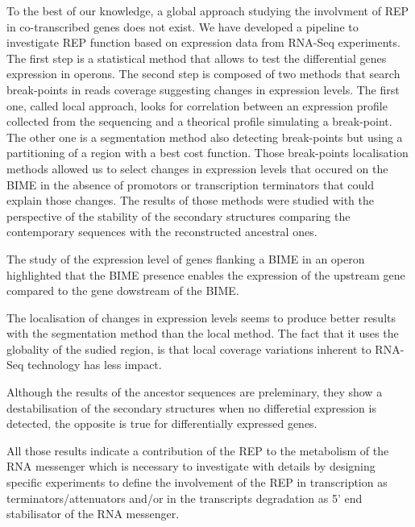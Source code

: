 \documentclass[12pt,a4paper]{report}
\begin{document}
To the best of our knowledge, a global approach studying the involvment of REP in co-transcribed genes does not exist. We have developed a pipeline to investigate REP function based on expression data from RNA-Seq experiments. The first step is a statistical method that allows to test the differential genes expression in operons. The second step is composed of two methods that search break-points in reads coverage suggesting changes in expression levels. The first one, called local approach, looks for correlation between an expression profile collected from the sequencing  and a theorical profile simulating a break-point. The other one is a segmentation method also detecting break-points but using a partitioning of a region with a best cost function. Those break-points localisation methods allowed us to select changes in expression levels that occured on the BIME in the absence of promotors or transcription terminators that could explain those changes. The results of those methods were studied with the perspective of the stability of the secondary structures comparing the contemporary sequences with the reconstructed ancestral ones.

The study of the expression level of genes flanking a BIME in an operon highlighted that the BIME presence enables the expression of the upstream gene compared to the gene dowstream of the BIME.

The localisation of changes in expression levels seems to produce better results with the segmentation method than the local method. The fact that it uses the globality of the sudied region, is that local coverage variations inherent to RNA-Seq technology has less impact.

Although the results of the ancestor sequences are preleminary, they show a destabilisation of the secondary structures when no differetial expression is detected, the opposite is true for differentially expressed genes.

All those results indicate a contribution of the REP to the metabolism of the RNA messenger which is necessary to investigate with details by designing specific experiments to define the involvement of the REP in transcription as terminators/attenuators and/or in the transcripts degradation as 5' end stabilisator of the RNA messenger.
\end{document}
